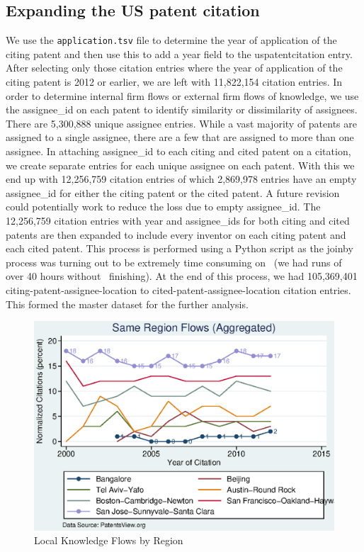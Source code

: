\documentclass[12pt]{article}
\begin{document}
\subsection{Expanding the US patent citation}
We use the \verb|application.tsv| file to determine the year of application of the citing patent and then use this to add a year field to the uspatentcitation entry. After selecting only those citation entries where the year of application of the citing patent is 2012 or earlier, we are left with 11,822,154 citation entries. In order to determine internal firm flows or external firm flows of knowledge, we use the assignee\_id on each patent to identify similarity or dissimilarity of assignees. There are 5,300,888 unique assignee entries. While a vast majority of patents are assigned to a single assignee, there are a few that are assigned to more than one assignee. In attaching assignee\_id to each citing and cited patent on a citation, we create separate entries for each unique assignee on each patent. With this we end up with 12,256,759 citation entries of which 2,869,978 entries have an empty assignee\_id for either the citing patent or the cited patent. A future revision could potentially work to reduce the loss due to empty assignee\_id. The 12,256,759 citation entries with year and assignee\_ids for both citing and cited patents are then expanded to include every inventor on each citing patent and each cited patent. This process is performed using a Python script as the joinby process was turning out to be extremely time consuming on \stata \ (we had runs of over 40 hours without \stata \ finishing). At the end of this process, we had 105,369,401 citing-patent-assignee-location to cited-patent-assignee-location citation entries. This formed the master dataset for the further analysis.


\begin{figure}[h]
\begin{centering}
  \includegraphics[width=\textwidth]{SameRegionFlows}
  \caption{Local Knowledge Flows by Region}
  \label{fig:SameRegionFlows}
\end{centering}
\end{figure}
\end{document}
